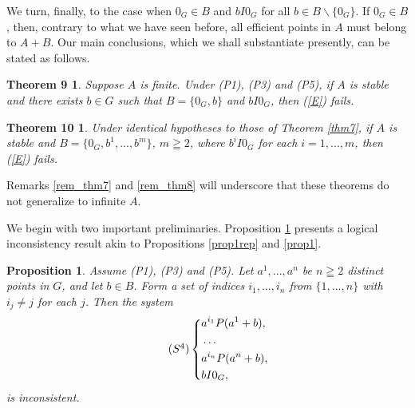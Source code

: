 \documentclass[pdflatex,sn-apa,11pt]{sn-jnl}%
\newtheorem*{theoremnine}{Theorem 9}
\newtheorem*{theoremten}{Theorem 10}
\newtheorem{proposition}{Proposition}%
\begin{document}
We turn, finally, to the case when $0_G \in B$ and $bI0_{G}$ for all $b \in B \backslash \{0_G\}$. If $0_{G} \in B$, then, contrary to what we have seen before, all efficient points in $A$ must belong to $A+B$. Our main conclusions, which we shall substantiate presently, can be stated as follows.

\begin{theoremnine}
Suppose $A$ is finite. Under (P1), (P3) and (P5), if $A$ is stable and there exists $b \in G$ such that $B = \{0_{G}, b\}$ and $bI0_{G}$, then (\ref{E}) fails.
\end{theoremnine}

\begin{theoremten}
Under identical hypotheses to those of Theorem \ref{thm7}, if $A$ is stable and $B = \{0_{G}, b^{1}, ..., b^{m}\}$, $m \geqq 2$, where $b^{i}I0_{G}$ for each $i = 1, ..., m$, then (\ref{E}) fails.
\end{theoremten}

Remarks \ref{rem_thm7} and \ref{rem_thm8} will underscore that these theorems do not generalize to infinite $A$.

We begin with two important preliminaries. Proposition \ref{prop4} presents a logical inconsistency result akin to Propositions \ref{prop1rep} and \ref{prop1}. %

\begin{proposition}
\label{prop4}
Assume (P1), (P3) and (P5). Let $a^1, ..., a^n$ be $n \geqq 2$ distinct points in $G$, and let $b \in B$. Form a set of indices $i_1, ..., i_n$ from $\{1, ..., n\}$ with $i_j \neq j$ for each $j$. Then the system
\begin{equation}
\tag{$S^{4}$}
\label{$S^{4}$}
  \left\{
    \begin{aligned}
      & a^{i_1}P(a^{1} + b), \\
      & \dots \\
      & a^{i_{n}}P(a^{n} + b), \\
      & bI{0_G},
    \end{aligned}
  \right.
\end{equation}
is inconsistent.
\end{proposition}
\end{document}
